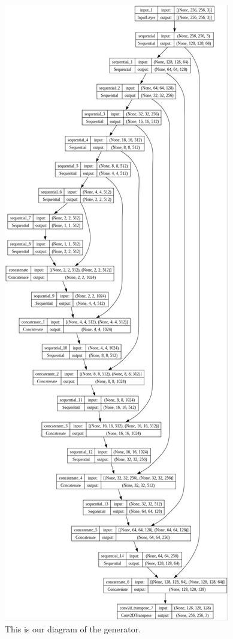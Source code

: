 \documentclass[conference]{IEEEtran}
\begin{document}
\begin{figure}[p]
\includegraphics[scale=0.25]{./generator.jpg}
  \caption{\label{fig:generator} This is our diagram of the generator.}
\centering
\end{figure}
\end{document}
